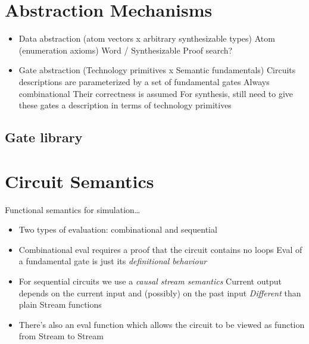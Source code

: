     \section{Abstraction Mechanisms}
    \label{sec:circuit-abstraction}
        \begin{itemize}
            \item Data abstraction (atom vectors x arbitrary synthesizable types)
                \subitem Atom (enumeration axioms)
                \subitem Word / Synthesizable
                    \subsubitem Proof search?
            \item Gate abstraction (Technology primitives x Semantic fundamentals)
                \subitem Circuits descriptions are parameterized by a set of fundamental gates
                    \subsubitem Always combinational
                    \subsubitem Their correctness is assumed
                \subitem For synthesis, still need to give these gates a description in terms of technology primitives
        \end{itemize}

        \subsection{Gate library}
        \label{subsec:gate-library}


    \section{Circuit Semantics}
    \label{sec:circuit-semantics}
        Functional semantics for simulation\ldots

        \begin{itemize}
            \item Two types of evaluation: combinational and sequential
            \item Combinational eval requires a proof that the circuit contains no loops
                \subitem Eval of a fundamental gate is just its \emph{definitional behaviour}

            \item For sequential circuits we use a \emph{causal stream semantics}
                \subitem Current output depends on the current input and (possibly) on the past input
                \subitem \emph{Different} than plain Stream functions

            \item There's also an eval function which allows the circuit to be viewed as function from Stream to Stream
        \end{itemize}

